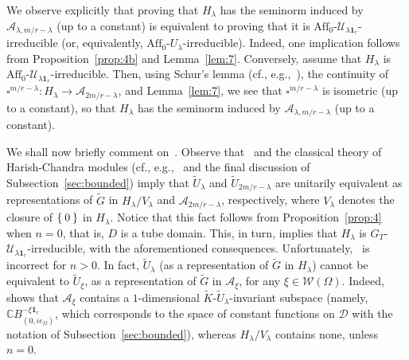 \documentclass[10.5pt,reqno]{amsart}
\newcommand{\Aff}{\mathrm{Aff}}
\newcommand{\vect}[1]{\mathbf{{#1}}}
\newcommand{\C}{\mathds{C}}
\newcommand{\Ac}{\mathcal{A}}
\newcommand{\Dc}{\mathcal{D}}
\newcommand{\Uc}{\mathcal{U}}
\newcommand{\Wc}{\mathcal{W}}
\begin{document}
We observe explicitly that proving that $H_\lambda$ has the seminorm induced by $\Ac_{\lambda, m/r-\lambda}$ (up to a constant) is equivalent to proving that it is $\Aff_0$-$\Uc_{\lambda\vect 1_r}$-irreducible (or, equivalently, $\Aff_0$-$U_\lambda$-irreducible). Indeed, one implication follows from Proposition~\ref{prop:4b} and   Lemma~\ref{lem:7}. Conversely, assume that $H_\lambda$ is $\Aff_0$-$\Uc_{\lambda\vect 1_r}$-irreducible. Then, using Schur's lemma (cf., e.g.,~\cite[Corollary 1 to Theorem 1]{Naimark}), the continuity of $\square^{m/r-\lambda}\colon H_\lambda\to \Ac_{2 m/r-\lambda}$,  and Lemma~\ref{lem:7}, we see that $\square^{m/r-\lambda}$ is isometric (up to a constant), so that $H_\lambda$ has the seminorm induced by $\Ac_{\lambda, m/r-\lambda}$ (up to a constant). 

We shall now briefly comment on~\cite[Theorem 5.4]{FarautKoranyi2}. Observe that~\cite[Theorem 5.4]{FarautKoranyi2} and the classical theory of Harish-Chandra modules (cf., e.g.,~\cite[Theorem 2.7]{Adamsetal} and the final discussion of Subsection~\ref{sec:bounded}) imply that $\widetilde U_\lambda$ and $\widetilde U_{2 m/r-\lambda}$ are unitarily equivalent as representations of $\widetilde G$ in $H_\lambda/V_\lambda$ and $\Ac_{2 m/r-\lambda}$, respectively, where $V_\lambda$ denotes the closure of $\Set{0}$ in $H_\lambda$. Notice that this fact follows from Proposition~\ref{prop:4} when $n=0$, that is, $D$ is a tube domain. 
This, in turn, implies that $H_\lambda$ is $G_T$-$\Uc_{\lambda\vect 1_r}$-irreducible, with the aforementioned consequences. 
Unfortunately,~\cite[Theorem 5.4]{FarautKoranyi2} is incorrect for $n>0$. In fact, $\widetilde U_\lambda$ (as a representation of $\widetilde G$ in $H_\lambda$) cannot be equivalent to $\widetilde U_\xi$, as a representation of $\widetilde G$ in $\Ac_\xi$, for any $\xi\in \Wc(\Omega)$. Indeed,~\cite[Theorem 2.1]{FarautKoranyi2} shows that $\Ac_\xi$ contains a $1$-dimensional $\widetilde K $-$\widetilde U_\lambda$-invariant subspace (namely, $\C B^{-\xi\vect 1_r}_{(0, i e_\Omega)}$, which corresponds to the space of constant functions on $\Dc$ with the notation of Subsection~\ref{sec:bounded}), whereas $H_\lambda/V_\lambda$ contains none, unless $n=0$.
\end{document}
